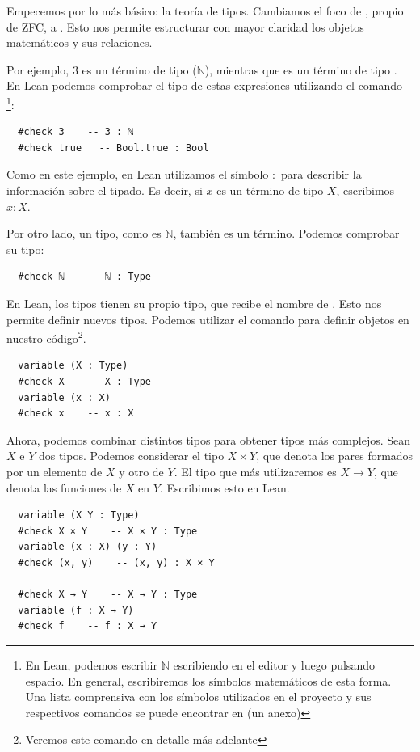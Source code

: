 Empecemos por lo más básico: la teoría de tipos. Cambiamos el foco de , propio de ZFC, a . Esto nos permite estructurar con mayor claridad los objetos matemáticos y sus relaciones.

Por ejemplo, $3$ es un término de tipo  ($\mathbb{N}$), mientras que  es un término de tipo . En Lean podemos comprobar el tipo de estas expresiones utilizando el comando \footnote{En Lean, podemos escribir $\mathbb{N}$ escribiendo  en el editor y luego pulsando espacio. En general, escribiremos los símbolos matemáticos de esta forma. Una lista comprensiva con los símbolos utilizados en el proyecto y sus respectivos comandos se puede encontrar en (un anexo)}:


\begin{lstlisting}
  #check 3    -- 3 : ℕ 
  #check true   -- Bool.true : Bool
\end{lstlisting}

Como en este ejemplo, en Lean utilizamos el símbolo $:$ para describir la información sobre el tipado. Es decir, si $x$ es un término de tipo $X$, escribimos $x : X$.

Por otro lado, un tipo, como es $\mathbb{N}$, también es un término. Podemos comprobar su tipo:

\begin{lstlisting}
  #check ℕ    -- ℕ : Type
\end{lstlisting}

En Lean, los tipos tienen su propio tipo, que recibe el nombre de . Esto nos permite definir nuevos tipos. Podemos utilizar el comando  para definir objetos en nuestro código\footnote{Veremos este comando en detalle más adelante}.

\begin{lstlisting}
  variable (X : Type)
  #check X    -- X : Type
  variable (x : X)
  #check x    -- x : X
\end{lstlisting}

Ahora, podemos combinar distintos tipos para obtener tipos más complejos. Sean $X$ e $Y$ dos tipos. Podemos considerar el tipo $X \times Y$, que denota los pares formados por un elemento de $X$ y otro de $Y$. El tipo que más utilizaremos es $X \to Y$, que denota las funciones de $X$ en $Y$. Escribimos esto en Lean.

\begin{lstlisting}
  variable (X Y : Type)
  #check X × Y    -- X × Y : Type
  variable (x : X) (y : Y)
  #check (x, y)    -- (x, y) : X × Y
  
  #check X → Y    -- X → Y : Type
  variable (f : X → Y)
  #check f    -- f : X → Y
\end{lstlisting}

